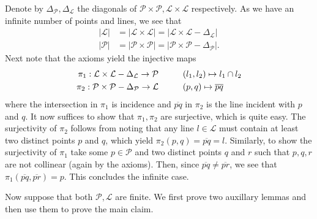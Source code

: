\documentclass{../../mathnotes}
\begin{document}
Denote by $\Delta_\mathcal{P},\Delta_{\mathcal{L}}$ the diagonals of $\mathcal{P}\times\mathcal{P},\mathcal{L}\times\mathcal{L}$ respectively. As we have an infinite number
of points and lines, we see that
\begin{align*}
    |\mathcal{L}|&=|\mathcal{L}\times\mathcal{L}|=|\mathcal{L}\times\mathcal{L}-\Delta_\mathcal{L}|\\
    |\mathcal{P}|&=|\mathcal{P}\times\mathcal{P}|=|\mathcal{P}\times\mathcal{P}-\Delta_\mathcal{P}|.
\end{align*}
Next note that the axioms yield the injective maps
\begin{align*}
    \pi_1:\mathcal{L}\times\mathcal{L}-\Delta_\mathcal{L}\to\mathcal{P} &\hspace{10mm} (l_1,l_2)\mapsto l_1\cap l_2\\
    \pi_2:\mathcal{P}\times\mathcal{P}-\Delta_\mathcal{P}\to\mathcal{L} &\hspace{10mm} (p,q)\mapsto \overline{pq}
\end{align*}
where the intersection in $\pi_1$ is incidence and $\overline{pq}$ in $\pi_2$ is the line incident with $p$ and $q$.
It now suffices to show that $\pi_1,\pi_2$ are surjective, which is quite easy. The surjectivity of $\pi_2$ follows from noting
that any line $l\in\mathcal{L}$ must contain at least two distinct points $p$ and $q$, which yield $\pi_2(p,q)=\overline{pq}=l$.
Similarly, to show the surjectivity of $\pi_1$ take some $p\in \mathcal{P}$ and two distinct points $q$ and $r$ such that $p,q,r$ are not collinear
(again by the axioms). Then, since $\overline{pq}\neq\overline{pr}$, we see that $\pi_1(\overline{pq},\overline{pr})=p$. This concludes the infinite case.

Now suppose that both $\mathcal{P},\mathcal{L}$ are finite. We first prove two auxillary lemmas and then use them to prove the main claim.
\end{document}
